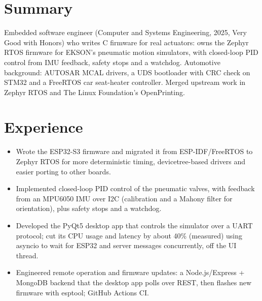 \documentclass[10pt]{article}
\begin{document}

\section*{Summary}
Embedded software engineer (Computer and Systems Engineering, 2025, Very Good with Honors) who writes C firmware for real actuators: owns the Zephyr RTOS firmware for EKSON's pneumatic motion simulators, with closed-loop PID control from IMU feedback, safety stops and a watchdog. Automotive background: AUTOSAR MCAL drivers, a UDS bootloader with CRC check on STM32 and a FreeRTOS car seat-heater controller. Merged upstream work in Zephyr RTOS and The Linux Foundation's OpenPrinting.

\section*{Experience}
\begin{itemize}
  \item Wrote the ESP32-S3 firmware and migrated it from ESP-IDF/FreeRTOS to Zephyr RTOS for more deterministic timing, devicetree-based drivers and easier porting to other boards.
  \item Implemented closed-loop PID control of the pneumatic valves, with feedback from an MPU6050 IMU over I2C (calibration and a Mahony filter for orientation), plus safety stops and a watchdog.
  \item Developed the PyQt5 desktop app that controls the simulator over a UART protocol; cut its CPU usage and latency by about 40\% (measured) using asyncio to wait for ESP32 and server messages concurrently, off the UI thread.
  \item Engineered remote operation and firmware updates: a Node.js/Express + MongoDB backend that the desktop app polls over REST, then flashes new firmware with esptool; GitHub Actions CI.
\end{itemize}
\end{document}
